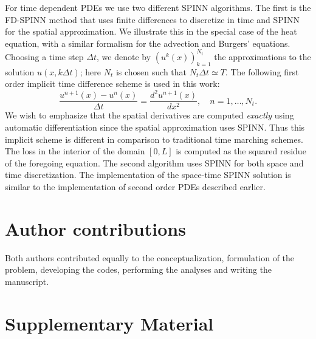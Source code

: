 \documentclass[12pt]{article}
\begin{document}
For time dependent PDEs we use two different SPINN algorithms. The first is the  FD-SPINN method that uses finite differences to discretize in time and SPINN for the spatial approximation. We illustrate this in the special case of the heat equation, with a similar formalism for the advection and Burgers' equations. Choosing a time step $\Delta t$, we denote by $(u^k(x))_{k=1}^{N_t}$ the approximations to the solution $u(x, k\Delta t)$; here $N_t$ is chosen such that $N_t \Delta t \simeq T$. The following first order implicit time difference scheme is used in this work:
\begin{displaymath}
\frac{u^{n+1}(x) - u^n(x)}{\Delta t} = \frac{d^2 u^{n+1}(x)}{d x^2}, \quad n = 1, \ldots, N_t.
\end{displaymath}
We wish to emphasize that the spatial derivatives are computed \emph{exactly} using automatic differentiation since the spatial approximation uses SPINN. Thus this implicit scheme is different in comparison to traditional time marching schemes. The loss in the interior of the domain $[0,L]$ is computed as the squared residue of the foregoing equation. The second algorithm uses SPINN for both space and time discretization. The implementation of the space-time SPINN solution is similar to the implementation of second order PDEs described earlier.

\section*{Author contributions}
Both authors contributed equally to the conceptualization, formulation of the problem, developing the codes, performing the analyses and writing the manuscript.




\newpage
\section*{Supplementary Material}
\appendix
\end{document}
